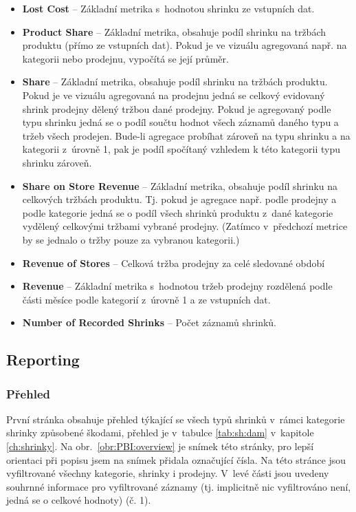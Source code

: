 \begin{itemize}
    \itemsep-0.3em
    \item     \textbf{Lost Cost} -- Základní metrika s~hodnotou shrinku ze vstupních dat.
    \item     \textbf{Product Share} -- Základní metrika, obsahuje podíl shrinku na tržbách produktu (přímo ze vstupních dat). Pokud je ve vizuálu agregovaná např. na kategorii nebo prodejnu, vypočítá se její průměr.
    \item     \textbf{Share} -- Základní metrika, obsahuje podíl shrinku na tržbách produktu. Pokud je ve vizuálu agregovaná na prodejnu jedná se celkový evidovaný shrink prodejny dělený tržbou dané prodejny. Pokud je agregovaný podle typu shrinku jedná se o podíl součtu hodnot všech záznamů daného typu a tržeb všech prodejen. Bude-li agregace probíhat zároveň na typu shrinku a na kategorii z~úrovně 1, pak je podíl spočítaný vzhledem k této kategorii typu shrinku zároveň. 
    \item     \textbf{Share on Store Revenue} -- Základní metrika, obsahuje podíl shrinku na celkových tržbách produktu. Tj. pokud je agregace např. podle prodejny a podle kategorie jedná se o podíl všech shrinků produktu z~dané kategorie vydělený celkovými tržbami vybrané prodejny. (Zatímco v~předchozí metrice by se jednalo o tržby pouze za vybranou kategorii.)
    \item     \textbf{Revenue of Stores} -- Celková tržba prodejny za celé sledované období
    \item     \textbf{Revenue} -- Základní metrika s~hodnotou tržeb prodejny rozdělená podle části měsíce podle kategorií z~úrovně 1 a  ze vstupních dat.
    \item     \textbf{Number of Recorded Shrinks} -- Počet záznamů shrinků.
\end{itemize}

\subsection{Reporting}

\subsubsection*{Přehled}

První stránka obsahuje přehled týkající se všech typů shrinků v~rámci kategorie shrinky způsobené škodami, přehled je v~tabulce \ref*{tab:sh:dam} v~kapitole \ref*{ch:shrinky}. Na obr.~\ref*{obr:PBI:overview} je snímek této stránky, pro lepší orientaci při popisu jsem na snímek přidala označující čísla. Na této stránce jsou vyfiltrované všechny kategorie, shrinky i prodejny. V~levé části jsou uvedeny souhrnné informace pro vyfiltrované záznamy (tj. implicitně nic vyfiltrováno není, jedná se o celkové hodnoty) (č. 1). 

